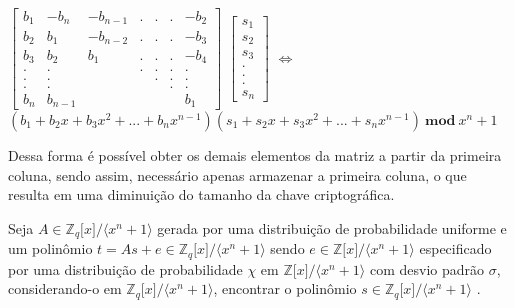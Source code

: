         \begin{center}
            $\begin{bmatrix}
                b_{1}   & -b_{n}   & -b_{n-1} & . & . & . & -b_{2}\\
                b_{2}   &  b_{1}   & -b_{n-2} & . & . & . & -b_{3}\\
                b_{3}   &  b_{2}   &  b_{1}   & . & . & . & -b_{4}\\
                .       & .        &          & . & . & . & .     \\
                .       & .        &          &   & . & . & .     \\
                .       & .        &          &   &   & . & .     \\
                b_{n} & b_{n-1}&              &   &   &   & b_{1}
            \end{bmatrix}$
            $\begin{bmatrix}
                s_1  \\
                s_2  \\
                s_3  \\
                .    \\
                .    \\
                .    \\
                s_{n}
            \end{bmatrix}$
            $\Leftrightarrow$
            $(b_1 + b_2 x + b_3 x^2 + ... + b_{n} x^{n-1})(s_1 + s_2 x + s_3 x^2 + ... + s_{n} x^{n-1})\ \textbf{mod}\ x^n + 1$
        \end{center}
    
    Dessa forma é possível obter os demais elementos da matriz a partir da primeira coluna, sendo assim, necessário apenas armazenar a primeira coluna, o que resulta em uma diminuição do tamanho da chave criptográfica. 
    
    \begin{definition}
        Seja $A \in \mathbb{Z}_q{[}x{]} / \langle x^n+1 \rangle$ gerada por uma distribuição de probabilidade uniforme e um polinômio $t = As + e \in \mathbb{Z}_q{[}x{]} / \langle x^n+1 \rangle$ sendo $e \in \mathbb{Z}{[}x{]} / \langle x^n+1 \rangle$ especificado por uma distribuição de probabilidade $\chi$ em $\mathbb{Z}{[}x{]} / \langle x^n+1 \rangle$ com desvio padrão $\sigma$, considerando-o em $\mathbb{Z}_q{[}x{]} / \langle x^n+1 \rangle$, encontrar o polinômio $s \in \mathbb{Z}_q{[}x{]} / \langle x^n+1 \rangle$ \cite{ring_lwe}. 
    \end{definition}
    

